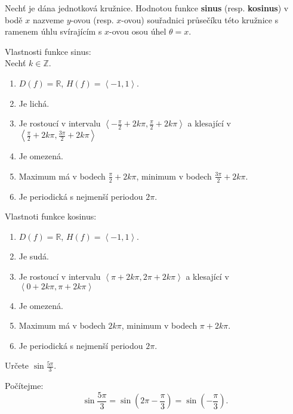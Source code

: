 \begin{definition}
  Nechť je dána jednotková kružnice. Hodnotou funkce \textbf{sinus} (resp. \textbf{kosinus})
  v bodě $x$ nazveme $y$-ovou (resp. $x$-ovou) souřadnici průsečíku této kružnice s ramenem
  úhlu svírajícím s $x$-ovou osou úhel $\theta = x$.
\end{definition}

\begin{veta}
    Vlastnosti funkce sinus:\\
    Nechť $k\in \mathbb Z.$
    \begin{enumerate}[$i.$]
        \item $D(f)= \mathbb R$, $H(f)= \left < -1,1 \right > $.
       	\item Je lichá.
        \item Je rostoucí v intervalu $\left < -\frac{\pi}{2}+2k\pi, \frac{\pi}{2}+2k\pi \right > $
        a klesající v $\left < \frac{\pi}{2}+2k\pi, \frac{3\pi}{2}+2k\pi \right > $
        \item Je omezená.
        \item Maximum má v bodech $\frac{\pi}{2}+2k\pi$, minimum v bodech $\frac{3\pi}{2}+2k\pi.$
        \item Je periodická s nejmenší periodou $2\pi.$
    \end{enumerate}
    Vlastnoti funkce kosinus:
    \begin{enumerate}[$i.$]
        \item $D(f)= \mathbb R$, $H(f)= \left < -1,1 \right > $.
       	\item Je sudá.
        \item Je rostoucí v intervalu $\left < \pi+2k\pi, 2\pi+2k\pi \right > $
        a klesající v $\left < 0+2k\pi, \pi+2k\pi \right > $
        \item Je omezená.
        \item Maximum má v bodech $2k\pi$, minimum v bodech $\pi+2k\pi.$
        \item Je periodická s nejmenší periodou $2\pi.$
    \end{enumerate}
\end{veta}

\begin{priklad}
Určete $\sin \frac{5\pi}{3}.$
\end{priklad}

\begin{reseni}
Počítejme:
$$\sin \frac{5\pi}{3}=\sin \left ( 2\pi-\frac{\pi}{3} \right ) =\sin \left ( -\frac{\pi}{3} \right ). $$
\end{reseni}

